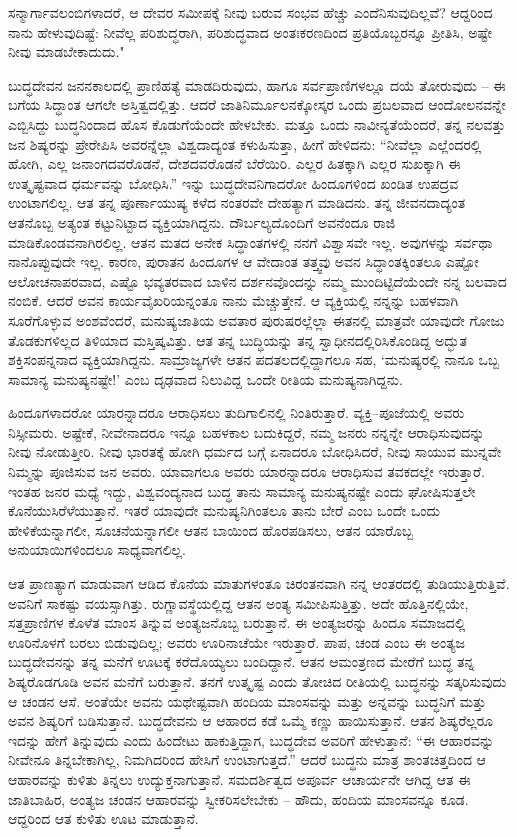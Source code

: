 ಸನ್ಮಾರ್ಗಾವಲಂಬಿಗಳಾದರೆ, ಆ ದೇವರ ಸಮೀಪಕ್ಕೆ ನೀವು ಬರುವ ಸಂಭವ ಹೆಚ್ಚು ಎಂದೆನಿಸುವುದಿಲ್ಲವೆ? ಆದ್ದರಿಂದ ನಾನು ಹೇಳುವುದಿಷ್ಟೆ: ನೀವೆಲ್ಲ ಪರಿಶುದ್ಧರಾಗಿ, ಪರಿಶುದ್ಧವಾದ ಅಂತಃಕರಣದಿಂದ ಪ್ರತಿಯೊಬ್ಬರನ್ನೂ ಪ್ರೀತಿಸಿ, ಅಷ್ಟೇ ನೀವು ಮಾಡಬೇಕಾದುದು."

ಬುದ್ಧದೇವನ ಜನನಕಾಲದಲ್ಲಿ ಪ್ರಾಣಿಹತ್ಯೆ ಮಾಡದಿರುವುದು, ಹಾಗೂ ಸರ್ವಪ್ರಾಣಿಗಳಲ್ಲೂ ದಯೆ ತೋರುವುದು – ಈ ಬಗೆಯ ಸಿದ್ಧಾಂತ ಆಗಲೇ ಅಸ್ತಿತ್ವದಲ್ಲಿತ್ತು. ಆದರೆ ಜಾತಿನಿರ್ಮೂಲನಕ್ಕೋಸ್ಕರ ಒಂದು ಪ್ರಬಲವಾದ ಆಂದೋಲನವನ್ನೇ ಎಬ್ಬಿಸಿದ್ದು ಬುದ್ಧನಿಂದಾದ ಹೊಸ ಕೊಡುಗೆಯೆಂದೇ ಹೇಳಬೇಕು. ಮತ್ತೂ ಒಂದು ನಾವೀನ್ಯತೆಯೆಂದರೆ, ತನ್ನ ನಲವತ್ತು ಜನ ಶಿಷ್ಯರನ್ನು ಪ್ರೇರೇಪಿಸಿ ಅವರನ್ನೆಲ್ಲಾ ವಿಶ್ವದಾದ್ಯಂತ ಕಳುಹಿಸುತ್ತಾ, ಹೀಗೆ ಹೇಳಿದನು: “ನೀವೆಲ್ಲಾ ಎಲ್ಲೆಂದರಲ್ಲಿ ಹೋಗಿ, ಎಲ್ಲ ಜನಾಂಗದವರೊಡನೆ, ದೇಶದವರೊಡನೆ ಬೆರೆಯಿರಿ. ಎಲ್ಲರ ಹಿತಕ್ಕಾಗಿ ಎಲ್ಲರ ಸುಖಕ್ಕಾಗಿ ಈ ಉತ್ಕೃಷ್ಟವಾದ ಧರ್ಮವನ್ನು ಬೋಧಿಸಿ.” ಇನ್ನು ಬುದ್ಧದೇವನಿಗಾದರೋ ಹಿಂದೂಗಳಿಂದ ಖಂಡಿತ ಉಪದ್ರವ ಉಂಟಾಗಲಿಲ್ಲ. ಆತ ತನ್ನ ಪೂರ್ಣಾಯುಷ್ಯ ಕಳೆದ ನಂತರವೇ ದೇಹತ್ಯಾಗ ಮಾಡಿದನು. ತನ್ನ ಜೀವನದಾದ್ಯಂತ ಆತನೊಬ್ಬ ಅತ್ಯಂತ ಕಟ್ಟುನಿಟ್ಟಾದ ವ್ಯಕ್ತಿಯಾಗಿದ್ದನು. ದೌರ್ಬಲ್ಯದೊಂದಿಗೆ ಅವನೆಂದೂ ರಾಜಿ ಮಾಡಿಕೊಂಡವನಾಗಿರಲಿಲ್ಲ. ಆತನ ಮತದ ಅನೇಕ ಸಿದ್ಧಾಂತಗಳಲ್ಲಿ ನನಗೆ ವಿಶ್ವಾಸವೇ ಇಲ್ಲ. ಅವುಗಳನ್ನು ಸರ್ವಥಾ ನಾನೊಪ್ಪುವುದೇ ಇಲ್ಲ. ಕಾರಣ, ಪುರಾತನ ಹಿಂದೂಗಳ ಆ ವೇದಾಂತ ತತ್ತ್ವವು ಅವನ ಸಿದ್ಧಾಂತಕ್ಕಿಂತಲೂ ಎಷ್ಟೋ ಆಲೋಚನಾಪರವಾದ, ಎಷ್ಟೊ ಭವ್ಯತರವಾದ ಬಾಳಿನ ದರ್ಶನವೊಂದನ್ನು ನಮ್ಮ ಮುಂದಿಟ್ಟಿದೆಯೆಂದೇ ನನ್ನ ಬಲವಾದ ನಂಬಿಕೆ. ಆದರೆ ಅವನ ಕಾರ್ಯವೈಖರಿಯನ್ನಂತೂ ನಾನು ಮೆಚ್ಚುತ್ತೇನೆ. ಆ ವ್ಯಕ್ತಿಯಲ್ಲಿ ನನ್ನನ್ನು ಬಹಳವಾಗಿ ಸೂರೆಗೊಳ್ಳುವ ಅಂಶವೆಂದರೆ, ಮನುಷ್ಯಜಾತಿಯ ಅವತಾರ ಪುರುಷರಲ್ಲೆಲ್ಲಾ ಈತನಲ್ಲಿ ಮಾತ್ರವೇ ಯಾವುದೇ ಗೋಜು ತೊಡಕುಗಳಿಲ್ಲದ ತಿಳಿಯಾದ ಮಸ್ತಿಷ್ಕವಿತ್ತು. ಆತ ತನ್ನ ಬುದ್ಧಿಯನ್ನು ತನ್ನ ಸ್ವಾಧೀನದಲ್ಲಿರಿಸಿಕೊಂಡಿದ್ದ ಅದ್ಭುತ ಶಕ್ತಿಸಂಪನ್ನನಾದ ವ್ಯಕ್ತಿಯಾಗಿದ್ದನು. ಸಾಮ್ರಾಜ್ಯಗಳೇ ಆತನ ಪದತಲದಲ್ಲಿದ್ದಾಗಲೂ ಸಹ, ‘ಮನುಷ್ಯರಲ್ಲಿ ನಾನೂ ಒಬ್ಬ ಸಾಮಾನ್ಯ ಮನುಷ್ಯನಷ್ಟೇ!’ ಎಂಬ ದೃಢವಾದ ನಿಲುವಿದ್ದ ಒಂದೇ ರೀತಿಯ ಮನುಷ್ಯನಾಗಿದ್ದನು.

ಹಿಂದೂಗಳಾದರೋ ಯಾರನ್ನಾದರೂ ಆರಾಧಿಸಲು ತುದಿಗಾಲಿನಲ್ಲಿ ನಿಂತಿರುತ್ತಾರೆ. ವ್ಯಕ್ತಿ–ಪೂಜೆಯಲ್ಲಿ ಅವರು ನಿಸ್ಸೀಮರು. ಅಷ್ಟೇಕೆ, ನೀವೇನಾದರೂ ಇನ್ನೂ ಬಹಳಕಾಲ ಬದುಕಿದ್ದರೆ, ನಮ್ಮ ಜನರು ನನ್ನನ್ನೇ ಆರಾಧಿಸುವುದನ್ನು ನೀವು ನೋಡುತ್ತೀರಿ. ನೀವು ಭಾರತಕ್ಕೆ ಹೋಗಿ ಧರ್ಮದ ಬಗ್ಗೆ ಏನಾದರೂ ಬೋಧಿಸಿದರೆ, ನೀವು ಸಾಯುವ ಮುನ್ನವೇ ನಿಮ್ಮನ್ನು ಪೂಜಿಸುವ ಜನ ಅವರು. ಯಾವಾಗಲೂ ಅವರು ಯಾರನ್ನಾದರೂ ಆರಾಧಿಸುವ ತವಕದಲ್ಲೇ ಇರುತ್ತಾರೆ. ಇಂತಹ ಜನರ ಮಧ್ಯೆ ಇದ್ದು, ವಿಶ್ವವಂದ್ಯನಾದ ಬುದ್ಧ ತಾನು ಸಾಮಾನ್ಯ ಮನುಷ್ಯನಷ್ಟೇ ಎಂದು ಘೋಷಿಸುತ್ತಲೇ ಕೊನೆಯುಸಿರೆಳೆಯುತ್ತಾನೆ. ಇತರೆ ಯಾವುದೇ ಮನುಷ್ಯನಿಗಿಂತಲೂ ತಾನು ಬೇರೆ ಎಂಬ ಒಂದೇ ಒಂದು ಹೇಳಿಕೆಯನ್ನಾಗಲೀ, ಸೂಚನೆಯನ್ನಾಗಲೀ ಆತನ ಬಾಯಿಂದ ಹೊರಪಡಿಸಲು, ಆತನ ಯಾರೊಬ್ಬ ಅನುಯಾಯಿಗಳಿಂದಲೂ ಸಾಧ್ಯವಾಗಲಿಲ್ಲ.

ಆತ ಪ್ರಾಣತ್ಯಾಗ ಮಾಡುವಾಗ ಆಡಿದ ಕೊನೆಯ ಮಾತುಗಳಂತೂ ಚಿರಂತನವಾಗಿ ನನ್ನ ಆಂತರದಲ್ಲಿ ತುಡಿಯುತ್ತಿರುತ್ತಿವೆ. ಅವನಿಗೆ ಸಾಕಷ್ಟು ವಯಸ್ಸಾಗಿತ್ತು. ರುಗ್ಣಾವಸ್ಥೆಯಲ್ಲಿದ್ದ ಆತನ ಅಂತ್ಯ ಸಮೀಪಿಸುತ್ತಿತ್ತು. ಅದೇ ಹೊತ್ತಿನಲ್ಲಿಯೇ, ಸತ್ತಪ್ರಾಣಿಗಳ ಕೊಳೆತ ಮಾಂಸ ತಿನ್ನುವ ಅಂತ್ಯಜನೊಬ್ಬ ಬರುತ್ತಾನೆ. ಈ ಅಂತ್ಯಜರನ್ನು ಹಿಂದೂ ಸಮಾಜದಲ್ಲಿ ಊರಿನೊಳಗೆ ಬರಲು ಬಿಡುವುದಿಲ್ಲ; ಅವರು ಊರಿನಾಚೆಯೇ ಇರುತ್ತಾರೆ. ಪಾಪ, ಚಂಡ ಎಂಬ ಈ ಅಂತ್ಯಜ ಬುದ್ಧದೇವನನ್ನು ತನ್ನ ಮನೆಗೆ ಊಟಕ್ಕೆ ಕರೆದೊಯ್ಯಲು ಬಂದಿದ್ದಾನೆ. ಆತನ ಆಮಂತ್ರಣದ ಮೇರೆಗೆ ಬುದ್ಧ ತನ್ನ ಶಿಷ್ಯರೊಡಗೂಡಿ ಅವನ ಮನೆಗೆ ಬರುತ್ತಾನೆ. ತನಗೆ ಉತ್ಕೃಷ್ಟ ಎಂದು ತೋಚಿದ ರೀತಿಯಲ್ಲಿ ಬುದ್ಧನನ್ನು ಸತ್ಕರಿಸುವುದು ಆ ಚಂಡನ ಆಸೆ. ಅಂತೆಯೇ ಅವನು ಯಥೇಷ್ಟವಾಗಿ ಹಂದಿಯ ಮಾಂಸವನ್ನು ಮತ್ತು ಅನ್ನವನ್ನು ಬುದ್ಧನಿಗೆ ಮತ್ತು ಅವನ ಶಿಷ್ಯರಿಗೆ ಬಡಿಸುತ್ತಾನೆ. ಬುದ್ಧದೇವನು ಆ ಆಹಾರದ ಕಡೆ ಒಮ್ಮೆ ಕಣ್ಣು ಹಾಯಿಸುತ್ತಾನೆ. ಆತನ ಶಿಷ್ಯರೆಲ್ಲರೂ ಇದನ್ನು ಹೇಗೆ ತಿನ್ನುವುದು ಎಂದು ಹಿಂದೇಟು ಹಾಕುತ್ತಿದ್ದಾಗ, ಬುದ್ಧದೇವ ಅವರಿಗೆ ಹೇಳುತ್ತಾನೆ: “ಈ ಆಹಾರವನ್ನು ನೀವೇನೂ ತಿನ್ನಬೇಕಾಗಿಲ್ಲ, ನಿಮಗಿದರಿಂದ ಹೇಸಿಗೆ ಉಂಟಾಗುತ್ತದೆ.” ಆದರೆ ಬುದ್ಧನು ಮಾತ್ರ ಶಾಂತಚಿತ್ತದಿಂದ ಆ ಆಹಾರವನ್ನು ಕುಳಿತು ತಿನ್ನಲು ಉದ್ಯುಕ್ತನಾಗುತ್ತಾನೆ. ಸಮದರ್ಶಿತ್ವದ ಅಪೂರ್ವ ಆಚಾರ್ಯನೇ ಆಗಿದ್ದ ಆತ ಈ ಜಾತಿಬಾಹಿರ, ಅಂತ್ಯಜ ಚಂಡನ ಆಹಾರವನ್ನು ಸ್ವೀಕರಿಸಲೇಬೇಕು – ಹೌದು, ಹಂದಿಯ ಮಾಂಸವನ್ನೂ ಕೂಡ. ಆದ್ದರಿಂದ ಆತ ಕುಳಿತು ಊಟ ಮಾಡುತ್ತಾನೆ.

